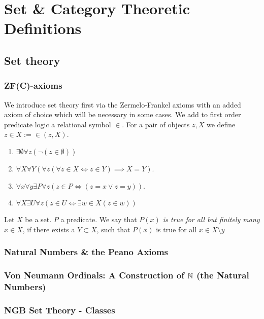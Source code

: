 \section{Set \& Category Theoretic Definitions}
\subsection{Set theory}
\subsubsection{ZF(C)-axioms}

We introduce set theory first via the Zermelo-Frankel axioms with an added axiom of choice which will be necessary in some cases. We add to first order predicate logic a relational symbol $\in$. For a pair of objects $z,X$ we define $z\in X :=  \in(z,X)$.
\begin{axioms}
    \begin{enumerate}\addtocounter{enumi}{-1}
        \item $\exists \emptyset\forall z(\neg(z\in \emptyset))$
        \item $\forall X\forall Y(\forall z(\forall z\in X \iff z \in Y)\implies X=Y)$.
        \item $\forall x\forall y\exists P \forall z\left(z\in P \iff \left(z = x \vee z = y\right)\right)$.
        \item $\forall X\exists U \forall z ( z \in U \iff \exists w \in X(z\in w))$
    \end{enumerate}
\end{axioms}
\begin{definition}
    Let $X$ be a set. $P$ a predicate. We say that \textit{$P(x)$ is true for all but finitely many $x\in X$}, if there exists a $Y\subset X$, such that $P(x)$ is true for all $x\in X\setminus y$
\end{definition}
\subsubsection{Natural Numbers \& the Peano Axioms}
\subsubsection{Von Neumann Ordinals: A Construction of $\mathbb{N}$ (the Natural Numbers)}
\subsubsection{NGB Set Theory - Classes}
